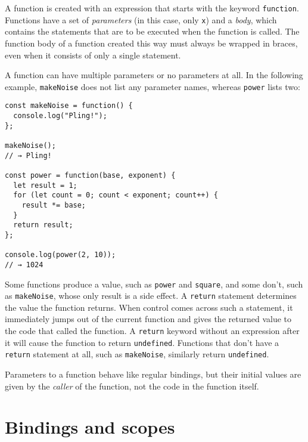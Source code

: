 A function is created with an expression that starts with the keyword \lstinline`function`. Functions have a set of \emph{parameters} (in this case, only \lstinline`x`) and a \emph{body}, which contains the statements that are to be executed when the function is called. The function body of a function created this way must always be wrapped in braces, even when it consists of only a single statement.

A function can have multiple parameters or no parameters at all. In the following example, \lstinline`makeNoise` does not list any parameter names, whereas \lstinline`power` lists two:

\begin{lstlisting}
const makeNoise = function() {
  console.log("Pling!");
};

makeNoise();
// → Pling!

const power = function(base, exponent) {
  let result = 1;
  for (let count = 0; count < exponent; count++) {
    result *= base;
  }
  return result;
};

console.log(power(2, 10));
// → 1024
\end{lstlisting}
\noindent{}

Some functions produce a value, such as \lstinline`power` and \lstinline`square`, and some don't, such as \lstinline`makeNoise`, whose only result is a side effect. A \lstinline`return` statement determines the value the function returns. When control comes across such a statement, it immediately jumps out of the current function and gives the returned value to the code that called the function. A \lstinline`return` keyword without an expression after it will cause the function to return \lstinline`undefined`. Functions that don't have a \lstinline`return` statement at all, such as \lstinline`makeNoise`, similarly return \lstinline`undefined`.

Parameters to a function behave like regular bindings, but their initial values are given by the \emph{caller} of the function, not the code in the function itself.

\section{Bindings and scopes}

